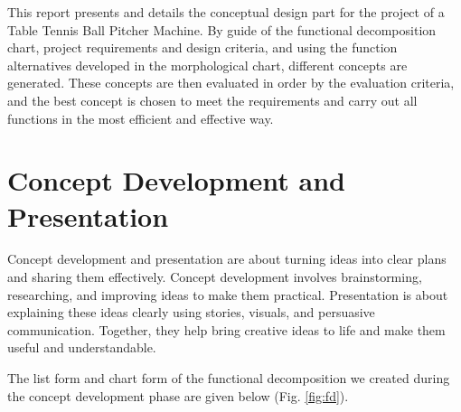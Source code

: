 \documentclass[12pt]{report}
\begin{document}
This report presents and details the conceptual design part for the project of a Table Tennis Ball Pitcher Machine. By guide of the functional decomposition chart, project requirements and design criteria, and using the function alternatives developed in the morphological chart, different concepts are generated. These concepts are then evaluated in order by the evaluation criteria, and the best concept is chosen to meet the requirements and carry out all functions in the most efficient and effective way.

\section{Concept Development and Presentation}

Concept development and presentation are about turning ideas into clear plans and sharing them effectively. Concept development involves brainstorming, researching, and improving ideas to make them practical. Presentation is about explaining these ideas clearly using stories, visuals, and persuasive communication. Together, they help bring creative ideas to life and make them useful and understandable.

The list form and chart form of the functional decomposition we created during the concept development phase are given below (Fig. \ref{fig:fd}).
\end{document}
